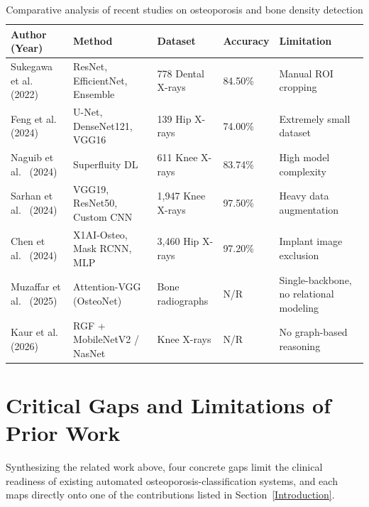 \documentclass[conference]{IEEEtran}
\begin{document}
\begin{table}[htbp]
\centering
\caption{Comparative analysis of recent studies on osteoporosis and bone density detection}
\label{tab:osteoporosis_lit_review}
\begin{tabular}{|p{1.5cm}|p{1.5cm}|p{1cm}|p{1cm}|p{1.5cm}|}
\hline
\textbf{Author (Year)} & \textbf{Method} & \textbf{Dataset} & \textbf{Accuracy} & \textbf{Limitation} \\
\hline
Sukegawa et al.~\cite{sukegawa2022identification} (2022) & ResNet, EfficientNet, Ensemble & 778 Dental X-rays & 84.50\% & Manual ROI cropping \\
\hline
Feng et al.~\cite{Feng2024} (2024) & U-Net, DenseNet121, VGG16 & 139 Hip X-rays & 74.00\% & Extremely small dataset \\
\hline
Naguib et al.~\cite{Naguib2024} (2024) & Superfluity DL & 611 Knee X-rays & 83.74\% & High model complexity \\
\hline
Sarhan et al.~\cite{Sarhan2024} (2024) & VGG19, ResNet50, Custom CNN & 1,947 Knee X-rays & 97.50\% & Heavy data augmentation \\
\hline
Chen et al.~\cite{Chen2024} (2024) & X1AI-Osteo, Mask RCNN, MLP & 3,460 Hip X-rays & 97.20\% & Implant image exclusion \\
\hline
Muzaffar et al.~\cite{muzaffar2025osteonet} (2025) & Attention-VGG (OsteoNet) & Bone radiographs & N/R & Single-backbone, no relational modeling \\
\hline
Kaur et al.~\cite{kaur2026interpretable} (2026) & RGF + MobileNetV2 / NasNet & Knee X-rays & N/R & No graph-based reasoning \\
\hline
\end{tabular}
\end{table}

\section{Critical Gaps and Limitations of Prior Work}
\label{gaps}
Synthesizing the related work above, four concrete gaps limit the clinical readiness of existing automated osteoporosis-classification systems, and each maps directly onto one of the contributions listed in Section~\ref{Introduction}.
\end{document}
